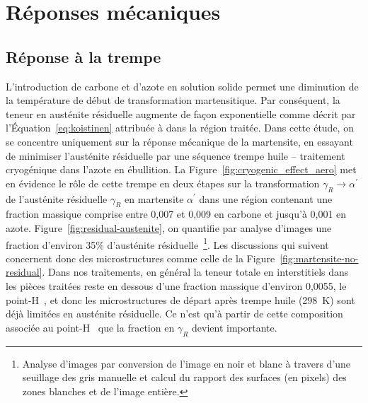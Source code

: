 \section{Réponses mécaniques}
\label{sec:reponses_mecaniques}

\subsection{Réponse à la trempe}

L'introduction de carbone et d'azote en solution solide permet une diminution de la température de début de transformation martensitique. Par conséquent, la teneur en austénite résiduelle augmente de façon exponentielle \textendash{} comme décrit par l'Équation~\ref{eq:koistinen} attribuée à \citet{Koistinen1959} \textendash{} dans la région traitée. Dans cette étude, on se concentre uniquement sur la réponse mécanique de la martensite, en essayant de minimiser l'austénite résiduelle par une séquence trempe huile -- traitement cryogénique dans l'azote en ébullition. La Figure~\ref{fig:cryogenic_effect_aero} met en évidence le rôle de cette trempe en deux étapes sur la transformation $\gamma_{R}\rightarrow\alpha^{\prime}$ de l'austénite résiduelle $\gamma_{R}$ en martensite $\alpha^{\prime}$ dans une région contenant une fraction massique comprise entre 0,007 et 0,009 en carbone et jusqu'à 0,001 en azote. Figure~\ref{fig:residual-austenite}, on quantifie par analyse d'images une fraction d'environ 35\% d'austénite résiduelle~\footnote{Analyse d'images par conversion de l'image en noir et blanc à travers d'une seuillage des gris manuelle et calcul du rapport des surfaces (en pixels) des zones blanches et de l'image entière.}. Les discussions qui suivent concernent donc des microstructures comme celle de la Figure~\ref{fig:martensite-no-residual}. Dans nos traitements, en général la teneur totale en interstitiels dans les pièces traitées reste en dessous d'une fraction massique d'environ 0,0055, le point-H~\cite{Sherby2008}, et donc les microstructures de départ après trempe huile (\SI{298}{\kelvin}) sont déjà limitées en austénite résiduelle. Ce n'est qu'à partir de cette composition associée au point-H~\cite{Sherby2008} que la fraction en $\gamma_{R}$ devient importante.

